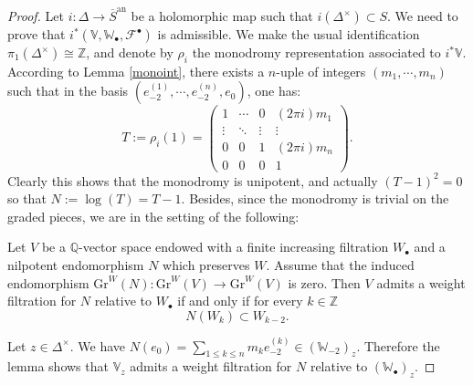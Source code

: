 \documentclass[10pt,a4paper]{amsart}
\newcommand{\Gr}{\mathrm{Gr}}
\newcommand{\Q}{\mathbb Q}
\newcommand{\V}{\mathbb V}
\newcommand{\W}{\mathbb W}
\newcommand{\Z}{\mathbb Z}
\newcommand{\an}{\mathrm{an}}
\newcommand{\bul}{\bullet}
\begin{document}
\begin{proof}
Let $i : \Delta \rightarrow \overline{S}^\an$ be a holomorphic map such that $i(\Delta^\times) \subset S$. We need to prove that $i^\ast (\V, \W_\bul, \mathcal{F}^\bul)$ is admissible. We make the usual identification $\pi_1(\Delta^\times) \cong \Z$, and denote by $\rho_i$ the monodromy representation associated to $i ^\ast \V$. According to Lemma \ref{monoint}, there exists a $n$-uple of integers $(m_1,\cdots, m_n)$ such that in the basis $(e_{-2}^{(1)}, \cdots, e_{-2}^{(n)}, e_0)$, one has:
\[
T := \rho_i(1) =  \left(\begin{array}{cccc}1  &  \cdots & 0 & (2\pi i) m_1 \\ \vdots & \ddots & \vdots & \vdots \\0 & 0 & 1 & (2\pi i) m_n  \\0 & 0 & 0 & 1\end{array}\right).
\]
Clearly this shows that the monodromy is unipotent, and actually $(T-1)^2 = 0$ so that $N := \log(T) = T-1$. Besides, since the monodromy is trivial on the graded pieces, we are in the setting of the following:
\begin{lemma}
Let $V$ be a $\Q$-vector space endowed with a finite increasing filtration $W_\bul$ and a nilpotent endomorphism $N$ which preserves $W$. Assume that the induced endomorphism $\Gr^W(N) : \Gr^W(V) \rightarrow \Gr^W(V)$ is zero. Then $V$ admits a weight filtration for $N$ relative to $W_\bul$ if and only if for every $k \in \Z$
\[
N(W_k) \subset W_{k-2}.
\]
\end{lemma}
Let $z \in \Delta^\times$. We have $N(e_0) = \sum_{1 \leqslant k \leqslant n} m_k e_{-2}^{(k)} \in (\W_{-2})_z$. Therefore the lemma shows that $\V_z$ admits a weight filtration for $N$ relative to $(\W_\bul)_z$.


\end{proof}
\end{document}
